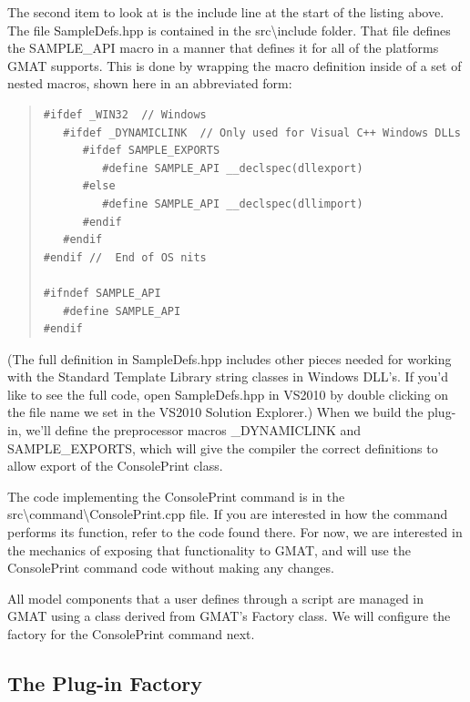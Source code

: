 \documentclass[10pt,letterpaper]{article}
\begin{document}
The second item to look at is the include line at the start of the listing above.  The file SampleDefs.hpp is contained in the src{\textbackslash}include folder.  That file defines the SAMPLE{\_}API macro in a manner that defines it for all of the platforms GMAT supports.  This is done by wrapping the macro definition inside of a set of nested macros, shown here in an abbreviated form:

\begin{quote}
\begin{verbatim}
#ifdef _WIN32  // Windows
   #ifdef _DYNAMICLINK  // Only used for Visual C++ Windows DLLs
      #ifdef SAMPLE_EXPORTS
         #define SAMPLE_API __declspec(dllexport)
      #else
         #define SAMPLE_API __declspec(dllimport)
      #endif
   #endif
#endif //  End of OS nits

#ifndef SAMPLE_API
   #define SAMPLE_API
#endif
\end{verbatim}
\end{quote}

\noindent (The full definition in SampleDefs.hpp includes other pieces needed for working with the Standard Template Library string classes in Windows DLL's.  If you'd like to see the full code, open SampleDefs.hpp in VS2010 by double clicking on the file name we set in the VS2010 Solution Explorer.)  When we build the plug-in, we'll define the preprocessor macros {\_}DYNAMICLINK and SAMPLE{\_}EXPORTS, which will give the compiler the correct definitions to allow export of the ConsolePrint class.

The code implementing the ConsolePrint command is in the src{\textbackslash}command{\textbackslash}ConsolePrint.cpp file.  If you are interested in how the command performs its function, refer to the code found there.  For now, we are interested in the mechanics of exposing that functionality to GMAT, and will use the ConsolePrint command code without making any changes.  

All model components that a user defines through a script are managed in GMAT using a class derived from GMAT's Factory class.  We will configure the factory for the ConsolePrint command next.  

\subsection{The Plug-in Factory}
\end{document}
